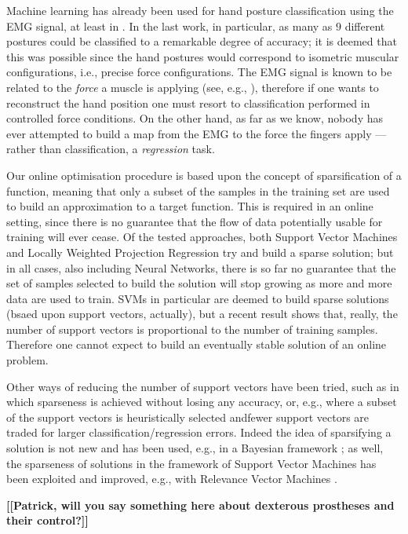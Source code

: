 Machine learning has already been used for hand posture classification
using the EMG signal, at least in \cite{dunlop,fukuda,smagt}. In the
last work, in particular, as many as $9$ different postures could be
classified to a remarkable degree of accuracy; it is deemed that this
was possible since the hand postures would correspond to isometric
muscular configurations, i.e., precise force configurations. The EMG
signal is known to be related to the \emph{force} a muscle is applying
(see, e.g., \cite{deluca}), therefore if one wants to reconstruct the
hand position one must resort to classification performed in
controlled force conditions. On the other hand, as far as we know,
nobody has ever attempted to build a map from the EMG to the force the
fingers apply --- rather than classification, a \emph{regression}
task.

Our online optimisation procedure is based upon the concept of
sparsification of a function, meaning that only a subset of the
samples in the training set are used to build an approximation to a
target function. This is required in an online setting, since there is
no guarantee that the flow of data potentially usable for training
will ever cease. Of the tested approaches, both Support Vector
Machines and Locally Weighted Projection Regression try and build a
sparse solution; but in all cases, also including Neural Networks,
there is so far no guarantee that the set of samples selected to build
the solution will stop growing as more and more data are used to
train. SVMs in particular are deemed to build sparse solutions (bsaed
upon support vectors, actually), but a recent result
\cite{Steinwart03} shows that, really, the number of support vectors
is proportional to the number of training samples. Therefore one
cannot expect to build an eventually stable solution of an online
problem.

Other ways of reducing the number of support vectors have been tried,
such as \cite{bmvc} in which sparseness is achieved without losing any
accuracy, or, e.g., \cite{LeeM01,KeerthiCDC06} where a subset of the
support vectors is heuristically selected andfewer support vectors are
traded for larger classification/regression errors. Indeed the idea of
sparsifying a solution is not new and has been used, e.g., in a
Bayesian framework \cite{figueiredo03adaptive}; as well, the
sparseness of solutions in the framework of Support Vector Machines
has been exploited and improved, e.g., with Relevance Vector Machines
\cite{tipping00relevance}.

\textbf{[[Patrick, will you say something here about dexterous
prostheses and their control?]]}

